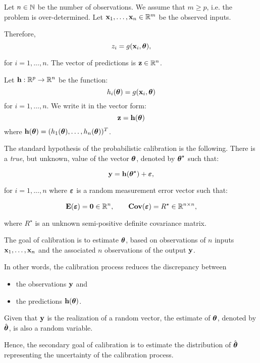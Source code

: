 \documentclass{beamer}
\begin{document}
\begin{frame}
Let $n \in \mathbb{N}$ be the number of observations. 
We assume that $m \geq p$, i.e. the problem is over-determined. 
Let ${\bf x}_1, \ldots, {\bf x}_n \in \mathbb{R}^{m}$ be the observed inputs. 

Therefore, 
$$
z_i = g({\bf x}_i, \boldsymbol{\theta}),
$$

for $i=1,...,n$. 
The vector of predictions is ${\bf z} \in \mathbb{R}^{n}$. 

Let ${\bf h} : \mathbb{R}^p \rightarrow \mathbb{R}^{n}$ be the function:
$$
h_i(\boldsymbol{\theta}) = g({\bf x}_i, \boldsymbol{\theta})
$$
for $i=1, \ldots, n$. 
We write it in the vector form:
$$
{\bf z} = {\bf h}(\boldsymbol{\theta})
$$
where ${\bf h}(\boldsymbol{\theta}) = (h_1(\boldsymbol{\theta}), \ldots, h_n(\boldsymbol{\theta}))^T$.

\end{frame}


\begin{frame}
The standard hypothesis of the probabilistic calibration is the following. 
There is a \emph{true}, but unknown, value of the vector $\boldsymbol{\theta}$, 
denoted by $\boldsymbol{\theta}^\star$ such that:

$$
{\bf y} = {\bf h}(\boldsymbol{\theta}^\star) + \boldsymbol{\varepsilon},
$$

for $i=1,...,n$ where $\boldsymbol{\varepsilon}$ is a random
measurement error vector such that:

$$
\mathbf{E}(\boldsymbol{\varepsilon}) = \boldsymbol{0} \in \mathbb{R}^{n}, \qquad 
\mathbf{Cov}(\boldsymbol{\varepsilon}) = R^\star \in \mathbb{R}^{n\times n},
$$

where $R^\star$ is an unknown semi-positive definite covariance matrix.

\end{frame}


\begin{frame}
The goal of calibration is to estimate $\boldsymbol{\theta}$, based on
observations of $n$ inputs
${\bf x}_1, \ldots, {\bf x}_n$ and the associated $n$
observations of the output ${\bf y}$. 

In other words, the calibration process reduces the discrepancy between 
\begin{itemize}
\item  the observations ${\bf y}$ and 
\item  the predictions ${\bf h}(\boldsymbol{\theta})$. 
\end{itemize}

Given that ${\bf y}$ is the realization of a random
vector, the estimate of $\boldsymbol{\theta}$, denoted by
$\hat{\boldsymbol{\theta}}$, is also a random variable. 

Hence, the secondary goal of calibration is to estimate the distribution of
$\hat{\boldsymbol{\theta}}$ representing the uncertainty of the
calibration process.

\end{frame}
\end{document}
